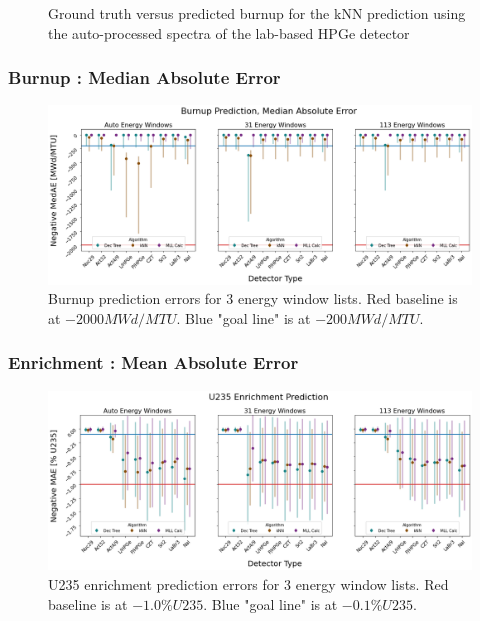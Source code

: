 \begin{frame}
\begin{adjustwidth}{0pt}{-15pt}
\begin{minipage}{0.49\textwidth}
\begin{figure}
      \caption{Ground truth versus predicted burnup for the kNN prediction using the auto-processed spectra of the lab-based HPGe detector}
    \end{figure}
  \end{minipage}
  \end{adjustwidth}
\end{frame}

\begin{frame}
  \frametitle{Burnup : Median Absolute Error}
  \begin{adjustwidth}{-25pt}{0pt}
  \begin{figure}
    \centering
    \includegraphics[width=1.15\textwidth]{./figures/detector_preds_wrt_enlist_med_burnup_median_err.png}
    \captionsetup{margin=0.6cm}
    \caption{Burnup prediction errors for 3 energy window lists. 
             Red baseline is at $-2000 MWd/MTU$. Blue "goal line" is at $-200 MWd/MTU$.}
  \end{figure}
  \end{adjustwidth}
\end{frame}

\begin{frame}
  \frametitle{Enrichment : Mean Absolute Error}
  \begin{adjustwidth}{-25pt}{0pt}
  \begin{figure}
    \centering
    \includegraphics[width=1.15\textwidth]{./figures/detector_preds_wrt_enlist_enrichment.png}
    \captionsetup{margin=0.6cm}
    \caption{U235 enrichment prediction errors for 3 energy window lists. 
             Red baseline is at $-1.0 \%U235$. Blue "goal line" is at $-0.1 \%U235$.}
  \end{figure}
  \end{adjustwidth}
\end{frame}

